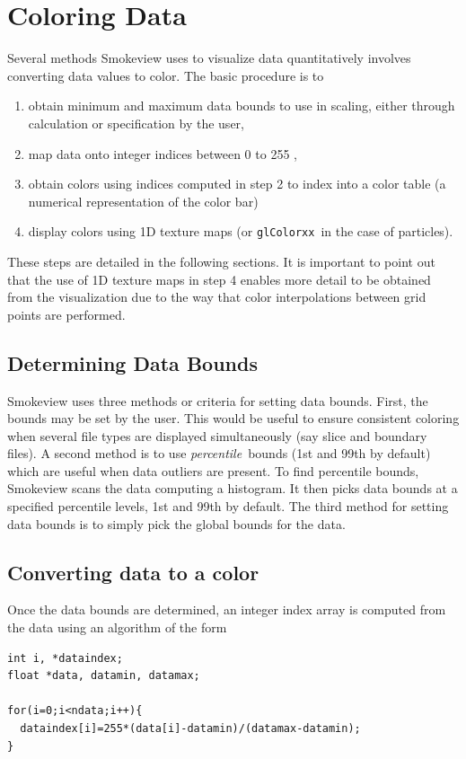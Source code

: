 \documentclass[11pt,twoside]{book}
\begin{document}
\chapter{Coloring Data}
Several methods Smokeview uses to visualize data quantitatively involves converting data values to color.
The basic procedure is to
\begin{enumerate}
\item obtain minimum and maximum data bounds to use in scaling, either through calculation or specification by the user,
\item map data onto integer indices between 0 to 255 ,
\item obtain colors using indices computed in step 2 to index into a color table (a numerical representation of the color bar)
\item display colors using 1D texture maps (or {\tt glColorxx}\ in the case of particles).
\end{enumerate}
These steps are detailed in the following sections.   It is important to point out that the use of 1D texture maps in step 4 enables more detail to be obtained from the visualization due to the way that color interpolations between grid points are performed.

\section{Determining Data Bounds}Smokeview uses three methods or criteria for setting data bounds.  First, the bounds may be set by the user.  This would be useful to ensure consistent coloring when several file types are displayed simultaneously (say slice and boundary files).  A second method is to use {\em percentile}\ bounds (1st and 99th by default) which are useful when data outliers are present.  To find percentile bounds, Smokeview scans the data computing a histogram.  It then picks data bounds at a specified percentile levels, 1st and 99th by default.  The third method for setting data bounds is to simply pick the global bounds for the data.

\section{Converting data to a color}
Once the data bounds are determined, an integer index array is computed from the data using an algorithm of the form
\begin{verbatim}
int i, *dataindex;
float *data, datamin, datamax;

for(i=0;i<ndata;i++){
  dataindex[i]=255*(data[i]-datamin)/(datamax-datamin);
}
\end{verbatim}
\end{document}
